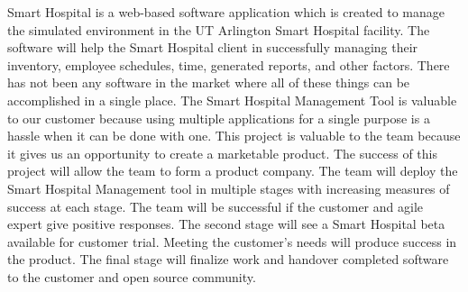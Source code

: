 Smart Hospital is a web-based software application which is created to manage the simulated environment in the UT Arlington Smart Hospital facility. The software will help the Smart Hospital client in successfully managing their inventory, employee schedules, time, generated reports, and other factors. There has not been any software in the market where all of these things can be accomplished in a single place. The Smart Hospital Management Tool is valuable to our customer because using multiple applications for a single purpose is a hassle when it can be done with one. This project is valuable to the team because it gives us an opportunity to create a marketable product. The success of this project will allow the team to form a product company. The team will deploy the Smart Hospital Management tool in multiple stages with increasing measures of success at each stage. The team will be successful if the customer and agile expert give positive responses. The second stage will see a Smart Hospital beta available for customer trial. Meeting the customer's needs will produce success in the product. The final stage will finalize work and handover completed software to the customer and open source community.